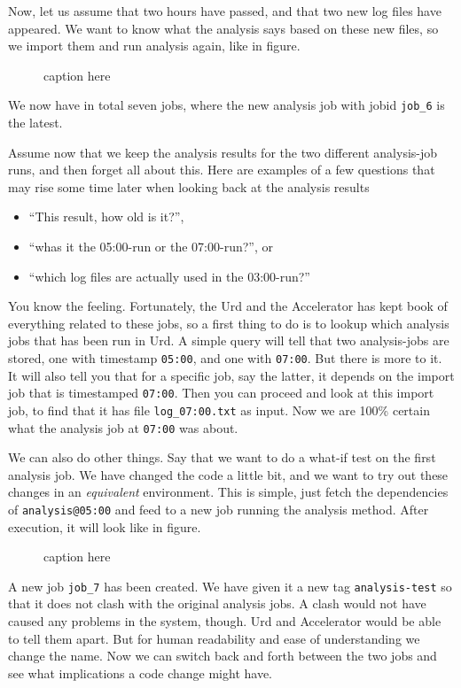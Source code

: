 \documentclass[a4paper]{article}
\begin{document}
Now, let us assume that two hours have passed, and that two new log
files have appeared.  We want to know what the analysis says based on
these new files, so we import them and run analysis again, like in
figure.
\begin{figure}[h!]
  \begin{center}
    
    \caption{caption here}
    \label{figure:example}
  \end{center}
\end{figure}
We now have in total seven jobs, where the new analysis job with jobid
\texttt{job\_6} is the latest.

Assume now that we keep the analysis results for the two different
analysis-job runs, and then forget all about this.  Here are examples
of a few questions that may rise some time later when looking back at
the analysis results

\begin{itemize}
\item[]``This result, how old is it?'',
\item[] ``whas it the 05:00-run or the 07:00-run?'', or
\item[] ``which log files are actually used in the 03:00-run?''
\end{itemize}

You know the feeling.  Fortunately, the Urd and the Accelerator has
kept book of everything related to these jobs, so a first thing to do
is to lookup which analysis jobs that has been run in Urd.  A simple
query will tell that two analysis-jobs are stored, one with timestamp
\texttt{05:00}, and one with \texttt{07:00}.  But there is more to it.
It will also tell you that for a specific job, say the latter, it
depends on the import job that is timestamped \texttt{07:00}.  Then
you can proceed and look at this import job, to find that it has file
\texttt{log\_07:00.txt} as input.  Now we are 100\% certain what the
analysis job at \texttt{07:00} was about.

We can also do other things.  Say that we want to do a what-if test on
the first analysis job.  We have changed the code a little bit, and we
want to try out these changes in an \textsl{equivalent} environment.
This is simple, just fetch the dependencies of \texttt{analysis@05:00}
and feed to a new job running the analysis method.  After execution,
it will look like in figure.
\begin{figure}[h!]
  \begin{center}
    
    \caption{caption here}
    \label{figure:example}
  \end{center}
\end{figure}
A new job \texttt{job\_7} has been created.  We have given it a new
tag \texttt{analysis-test} so that it does not clash with the original
analysis jobs.  A clash would not have caused any problems in the
system, though.  Urd and Accelerator would be able to tell them apart.
But for human readability and ease of understanding we change the
name.  Now we can switch back and forth between the two jobs and see
what implications a code change might have.
\end{document}
